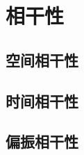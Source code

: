

\section{相干性}\label{25-4}

\subsection{空间相干性}\label{25-4-1}

\subsection{时间相干性}\label{25-4-2}

\subsection{偏振相干性}\label{25-4-3}